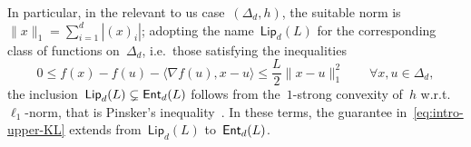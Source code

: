\documentclass[11pt]{article}
\numberwithin{equation}{section}
\let\le\leqslant
\theoremstyle{remark}
\newcommand{\inner}[2]{\langle #1,#2\rangle}
\newcommand{\Ent}{\textup{\textsf{Ent}}}
\let\Div\relax\newcommand{\Div}{D_h}
\let\Dh\Div
\newcommand{\Fh}{\Ent_d}
\newcommand{\Vh}{\textsf{Lip}_d}
\newcommand{\Simp}{\Delta_d}
\newcommand{\1}{\mathbf{1}}
\newcommand{\bnabla}{\nabla}
\begin{document}
In particular, in the relevant to us case~$(\Simp,h)$, the suitable norm is~$\|x\|_{1} = \sum_{i = 1}^d |(x)_i|$;
adopting the name~$\Vh(L)$ for the corresponding class of functions on~$\Simp$, i.e.~those satisfying the inequalities
\begin{equation}
\label{eq:intro-l1-smoothness}
0 \le f(x) - f(u) - \inner{\bnabla f(u)}{x-u} \le \frac{L}{2} \|x-u\|_1^2
\qquad \forall x,u \in \Simp,
\end{equation}
the inclusion~$\Vh(L) \subsetneq \Fh(L)$ follows from  the~$1$-strong convexity of~$h$ w.r.t.~$\ell_1$-norm, that is Pinsker's inequality~\cite{pinsker1964information}.  In these terms, the guarantee in~\eqref{eq:intro-upper-KL} extends from~$\Vh(L)$ to~$\Fh(L)$.

\end{document}
